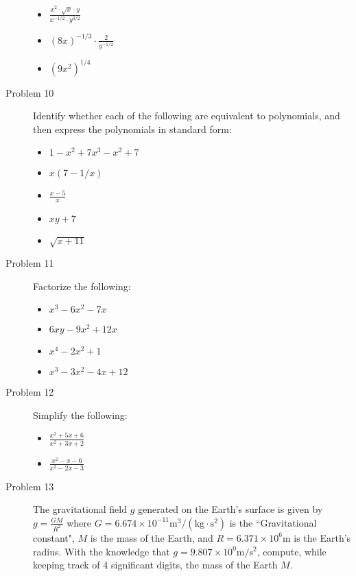 \documentclass{article}
\begin{document}
\begin{description}
	\begin{itemize}
	\item \(\frac{x^2 \cdot \sqrt{x} \cdot y}{x^{-1/2} \cdot y^{3/2}}\)
	\item \((8x)^{-1/3} \cdot \frac{2}{y^{-1/2}}\)
	\item \((9x^2)^{1/4}\)
	\end{itemize}
\item[Problem 10] Identify whether each of the following are equivalent to polynomials, and then express the polynomials in standard form:
	\begin{itemize}
	\item \(1 - x^2 + 7x^3 - x^2 + 7\)
	\item \(x(7 - 1/x)\)
	\item \(\frac{x - 5}{x}\)
	\item \(xy + 7\)
	\item \(\sqrt{x + 11}\)
	\end{itemize}
\item[Problem 11] Factorize the following: 
	\begin{itemize}
	\item \(x^3 - 6x^2 - 7x\)
	\item \(6xy - 9x^2 + 12x\)
	\item \(x^4 - 2x^2 + 1\)
	\item \(x^3 - 3x^2 - 4x + 12\) 
	\end{itemize}
\item[Problem 12] Simplify the following:
	\begin{itemize}
	\item \(\frac{x^2 + 5x + 6}{x^2 + 3x + 2}\)
	\item \(\frac{x^2 - x - 6}{x^2 - 2x - 3}\)
	\end{itemize}
\item[Problem 13] The gravitational field \(g\) generated on the Earth's surface is given by \(g = \frac{GM}{R^2}\) where \(G = 6.674 \times 10^{-11} \text{m}^3/(\text{kg} \cdot \text{s}^2)\) is the ``Gravitational constant", \(M\) is the mass of the Earth, and \(R = 6.371 \times 10^6 \text{m}\) is the Earth's radius. With the knowledge that \(g = 9.807 \times 10^0 \text{m}/\text{s}^2\), compute, while keeping track of 4 significant digits, the mass of the Earth \(M\).  
\end{description}
\end{document}
